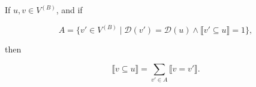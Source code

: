 If $u, v \in V^{(B)}$, and if

$$A = \{v' \in V^{(B)} \mid \mathcal{D}(v') = \mathcal{D}(u) \land \llbracket v' \subseteq u \rrbracket = 1\},$$

then

$$\llbracket v \subseteq u \rrbracket = \sum_{v' \in A} \llbracket v = v' \rrbracket.$$
